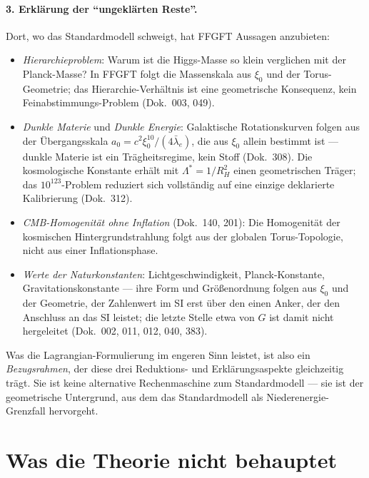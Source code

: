 \paragraph{3. Erklärung der \enquote{ungeklärten Reste}.}
Dort, wo das Standardmodell schweigt, hat FFGFT Aussagen anzubieten:
\begin{itemize}\setlength\itemsep{0pt}
  \item \emph{Hierarchieproblem}: Warum ist die Higgs-Masse so klein
        verglichen mit der Planck-Masse? In FFGFT folgt die
        Massenskala aus $\xi_0$ und der Torus-Geometrie; das
        Hierarchie-Verhältnis ist eine geometrische Konsequenz, kein
        Feinabstimmungs-Problem (Dok.~003, 049).
  \item \emph{Dunkle Materie} und \emph{Dunkle Energie}: Galaktische
        Rotationskurven folgen aus der Übergangsskala $a_0 = c^2\xi_0^{10}/(4\bar\lambda_e)$,
        die aus $\xi_0$ allein bestimmt ist --- dunkle Materie ist ein
        Trägheitsregime, kein Stoff (Dok.~308). Die kosmologische Konstante
        erhält mit $\Lambda^* = 1/R_H^2$ einen geometrischen Träger; das
        $10^{123}$-Problem reduziert sich vollständig auf eine einzige
        deklarierte Kalibrierung (Dok.~312).
  \item \emph{CMB-Homogenität ohne Inflation} (Dok.~140, 201): Die
        Homogenität der kosmischen Hintergrundstrahlung folgt aus
        der globalen Torus-Topologie, nicht aus einer
        Inflationsphase.
  \item \emph{Werte der Naturkonstanten}: Lichtgeschwindigkeit,
        Planck-Konstante, Gravitationskonstante --- ihre Form und
        Größenordnung folgen aus $\xi_0$ und der Geometrie, der
        Zahlenwert im SI erst über den einen Anker, der den Anschluss an
        das SI leistet; die letzte Stelle etwa von $G$ ist damit nicht
        hergeleitet (Dok.~002, 011, 012, 040, 383).
\end{itemize}

Was die Lagrangian-Formulierung im engeren Sinn leistet, ist also
ein \emph{Bezugsrahmen}, der diese drei Reduktions- und
Erklärungsaspekte gleichzeitig trägt. Sie ist keine alternative
Rechenmaschine zum Standardmodell --- sie ist der geometrische
Untergrund, aus dem das Standardmodell als Niederenergie-Grenzfall
hervorgeht.

\section{Was die Theorie nicht behauptet}

